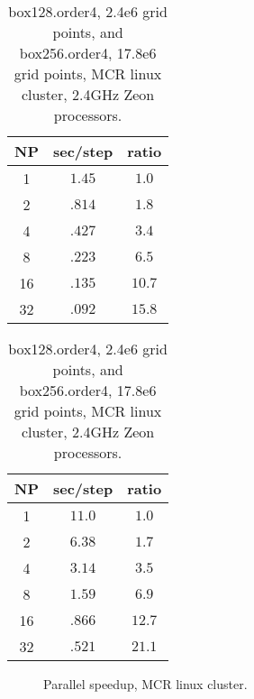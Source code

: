 \documentclass[12pt]{article}
\begin{document}
\begin{table}[hbt]
\begin{center}\footnotesize
\begin{tabular}{|c|c|c|} \hline 
     NP       & sec/step   & ratio \\   \hline\hline 
     1        &  $1.45$    & $ 1.0 $   \\ 
     2        &  $.814$    & $ 1.8 $   \\ 
     4        &  $.427$    & $ 3.4 $   \\ 
     8        &  $.223$    & $ 6.5 $   \\ 
    16        &  $.135$    & $10.7 $   \\ 
    32        &  $.092$    & $15.8 $   \\ \hline 
\end{tabular}		
\qquad
\begin{tabular}{|c|c|c|} \hline 
     NP       & sec/step   & ratio \\   \hline\hline 
     1        &  $11.0$    & $ 1.0 $   \\ 
     2        &  $6.38$    & $ 1.7 $   \\ 
     4        &  $3.14$    & $ 3.5 $   \\ 
     8        &  $1.59$    & $ 6.9 $   \\ 
    16        &  $.866$    & $12.7 $   \\ 
    32        &  $.521$    & $21.1 $   \\ \hline 
\end{tabular}	
\end{center}		
\caption{box128.order4, 2.4e6 grid points, and box256.order4, 17.8e6 grid points, MCR linux cluster, 2.4GHz Zeon processors.}
 \label{tab:box} 
\end{table}

\begin{figure}
\begin{center}
\end{center}
\caption{Parallel speedup,  MCR linux cluster.}
\end{figure}




\end{document}
